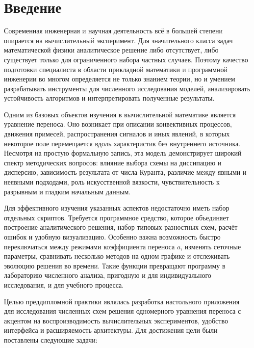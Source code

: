 \documentclass[a4paper,14pt]{extreport}
\begin{document}
\chapter*{Введение}

Современная инженерная и научная деятельность всё в большей степени опирается на вычислительный эксперимент. Для значительного класса задач математической физики аналитическое решение либо отсутствует, либо существует только для ограниченного набора частных случаев. Поэтому качество подготовки специалиста в области прикладной математики и программной инженерии во многом определяется не только знанием теории, но и умением разрабатывать инструменты для численного исследования моделей, анализировать устойчивость алгоритмов и интерпретировать полученные результаты.

Одним из базовых объектов изучения в вычислительной математике является уравнение переноса. Оно возникает при описании конвективных процессов, движения примесей, распространения сигналов и иных явлений, в которых некоторое поле перемещается вдоль характеристик без внутреннего источника. Несмотря на простую формальную запись, эта модель демонстрирует широкий спектр методических вопросов: влияние выбора схемы на диссипацию и дисперсию, зависимость результата от числа Куранта, различие между явными и неявными подходами, роль искусственной вязкости, чувствительность к разрывным и гладким начальным данным.

Для эффективного изучения указанных аспектов недостаточно иметь набор отдельных скриптов. Требуется программное средство, которое объединяет построение аналитического решения, набор типовых разностных схем, расчёт ошибок и удобную визуализацию. Особенно важна возможность быстро переключаться между режимами коэффициента переноса $a$, изменять сеточные параметры, сравнивать несколько методов на одном графике и отслеживать эволюцию решения во времени. Такие функции превращают программу в лабораторию численного анализа, пригодную и для индивидуального исследования, и для учебного процесса.

Целью преддипломной практики являлась разработка настольного приложения для исследования численных схем решения одномерного уравнения переноса с акцентом на воспроизводимость вычислительных экспериментов, удобство интерфейса и расширяемость архитектуры. Для достижения цели были поставлены следующие задачи:
\end{document}
